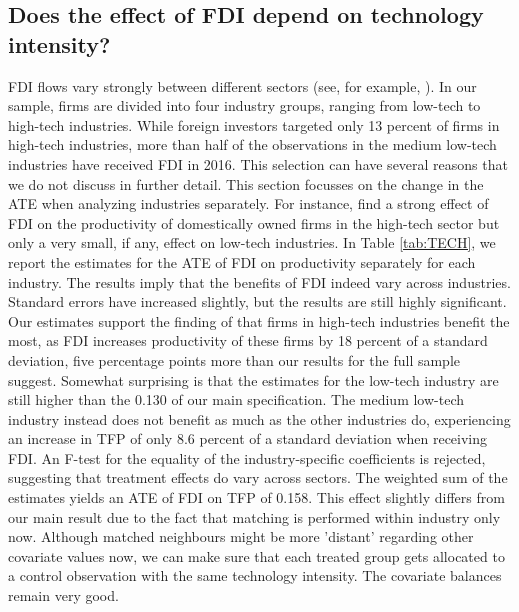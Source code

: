 \documentclass[a4paper,11pt]{scrartcl}
\begin{document}
\subsection{Does the effect of FDI depend on technology intensity?}

FDI flows vary strongly between different sectors (see, for example, \citet{Smarzynska2004, Keller2009, Haskel2007}). In our sample, firms are divided into four industry groups, ranging from low-tech to high-tech industries. While foreign investors targeted only 13 percent of firms in high-tech industries, more than half of the observations in the medium low-tech industries have received FDI in 2016. %
This selection can have several reasons that we do not discuss in further detail. This section focusses on the change in the ATE when analyzing industries separately. For instance, \citet{Keller2009} find a strong effect of FDI on the productivity of domestically owned firms in the high-tech sector but only a very small, if any, effect on low-tech industries. In Table \ref{tab:TECH}, we report the estimates for the ATE of FDI on productivity separately for each industry. The results imply that the benefits of FDI indeed vary across industries. Standard errors have increased slightly, but the results are still highly significant. Our estimates support the finding of \citet{Keller2009} that firms in high-tech industries benefit the most, as FDI increases productivity of these firms by 18 percent of a standard deviation, five percentage points more than our results for the full sample suggest. Somewhat surprising is that the estimates for the low-tech industry are still higher than the 0.130 of our main specification. The medium low-tech industry instead does not benefit as much as the other industries do, experiencing an increase in TFP of only 8.6 percent of a standard deviation when receiving FDI. 
An F-test for the equality of the industry-specific coefficients is rejected, suggesting that treatment effects do vary across sectors. 
The weighted sum of the estimates yields an ATE of FDI on TFP of 0.158. This effect slightly differs from our main result due to the fact that matching is performed within industry only now. Although matched neighbours might be more 'distant' regarding other covariate values now, we can make sure that each treated group gets allocated to a control observation with the same technology intensity. The covariate balances remain very good. 
\end{document}
